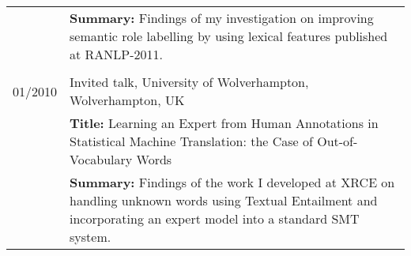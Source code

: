 \begin{tabular}{p{2cm}  p{13.92cm}}
	& {\bf Summary:} Findings of my investigation on improving semantic role labelling by using lexical 	features published at RANLP-2011.  \\
	& \\
01/2010	& Invited talk, University of Wolverhampton, Wolverhampton, UK \\
	& {\bf Title:} Learning an Expert from Human Annotations in Statistical Machine Translation: the 	Case of Out-of-Vocabulary Words \\
	& {\bf Summary:} Findings of the work I developed at XRCE on handling unknown words 	using Textual Entailment and incorporating an expert model into a standard SMT system. 
	\\
\end{tabular}

